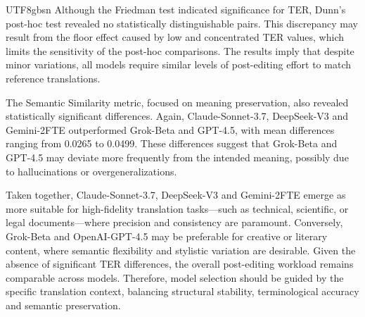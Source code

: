 \documentclass[conference]{IEEEtran}
\begin{document}
\begin{CJK*}{UTF8}{gbsn}
Although the Friedman test indicated significance for TER, Dunn’s post-hoc test revealed no statistically distinguishable pairs. This discrepancy may result from the floor effect caused by low and concentrated TER values, which limits the sensitivity of the post-hoc comparisons. The results imply that despite minor variations, all models require similar levels of post-editing effort to match reference translations.

The Semantic Similarity metric, focused on meaning preservation, also revealed statistically significant differences. Again, Claude-Sonnet-3.7, DeepSeek-V3 and Gemini-2FTE outperformed Grok-Beta and GPT-4.5, with mean differences ranging from 0.0265 to 0.0499. These differences suggest that Grok-Beta and GPT-4.5 may deviate more frequently from the intended meaning, possibly due to hallucinations or overgeneralizations.

Taken together, Claude-Sonnet-3.7, DeepSeek-V3 and Gemini-2FTE emerge as more suitable for high-fidelity translation tasks—such as technical, scientific, or legal documents—where precision and consistency are paramount. Conversely, Grok-Beta and OpenAI-GPT-4.5 may be preferable for creative or literary content, where semantic flexibility and stylistic variation are desirable. Given the absence of significant TER differences, the overall post-editing workload remains comparable across models. Therefore, model selection should be guided by the specific translation context, balancing structural stability, terminological accuracy and semantic preservation.


\end{CJK*}
\end{document}
